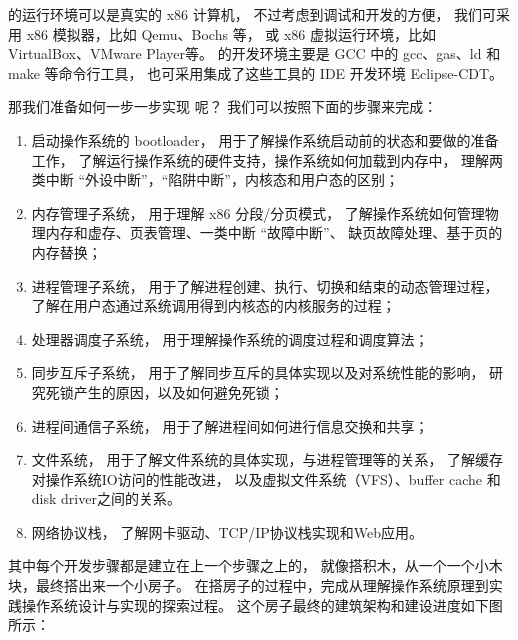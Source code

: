 \ucore 的运行环境可以是真实的 x86 计算机，
不过考虑到调试和开发的方便，
我们可采用 x86 模拟器，比如 Qemu、Bochs 等，
或 x86 虚拟运行环境，比如 VirtualBox、VMware Player等。
\ucore 的开发环境主要是 GCC 中的 gcc、gas、ld 和 make 等命令行工具，
也可采用集成了这些工具的 IDE 开发环境 Eclipse-CDT。

那我们准备如何一步一步实现 \ucore 呢？
我们可以按照下面的步骤来完成：
\begin{small}
\begin{enumerate}[label=\arabic*)]
    \item %
        启动操作系统的 bootloader，%
        用于了解操作系统启动前的状态和要做的准备工作，%
        了解运行操作系统的硬件支持，操作系统如何加载到内存中，%
        理解两类中断 \cndash “外设中断”，“陷阱中断”，内核态和用户态的区别；
    \item %
        内存管理子系统，%
        用于理解 x86 分段/分页模式，%
        了解操作系统如何管理物理内存和虚存、页表管理、一类中断 \cndash “故障中断”、%
        缺页故障处理、基于页的内存替换；
    \item %
        进程管理子系统，%
        用于了解进程创建、执行、切换和结束的动态管理过程，%
        了解在用户态通过系统调用得到内核态的内核服务的过程；
    \item %
        处理器调度子系统，%
        用于理解操作系统的调度过程和调度算法；
    \item %
        同步互斥子系统，%
        用于了解同步互斥的具体实现以及对系统性能的影响，%
        研究死锁产生的原因，以及如何避免死锁；
    \item %
        进程间通信子系统，%
        用于了解进程间如何进行信息交换和共享；
    \item %
        文件系统，%
        用于了解文件系统的具体实现，与进程管理等的关系，%
        了解缓存对操作系统IO访问的性能改进，%
        以及虚拟文件系统（VFS）、buffer cache 和 disk driver之间的关系。
    \item %
        网络协议栈，%
        了解网卡驱动、TCP/IP协议栈实现和Web应用。
\end{enumerate}
\end{small}

其中每个开发步骤都是建立在上一个步骤之上的，
就像搭积木，从一个一个小木块，最终搭出来一个小房子。
在搭房子的过程中，完成从理解操作系统原理到实践操作系统设计与实现的探索过程。
这个房子最终的建筑架构和建设进度如下图所示：

